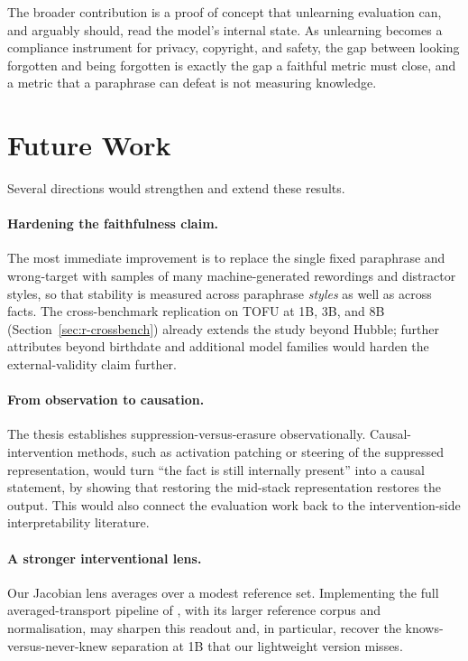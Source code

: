 The broader contribution is a proof of concept that unlearning evaluation can, and arguably should, read the
model's internal state. As unlearning becomes a compliance instrument for privacy, copyright, and safety,
the gap between looking forgotten and being forgotten is exactly the gap a faithful metric must close, and a
metric that a paraphrase can defeat is not measuring knowledge.

\section{Future Work}
\label{sec:c-future}

Several directions would strengthen and extend these results.

\paragraph{Hardening the faithfulness claim.}
The most immediate improvement is to replace the single fixed paraphrase and wrong-target with samples of
many machine-generated rewordings and distractor styles, so that stability is measured across paraphrase
\emph{styles} as well as across facts. The cross-benchmark replication on TOFU at 1B, 3B, and 8B
(Section~\ref{sec:r-crossbench}) already extends the study beyond Hubble; further attributes beyond
birthdate and additional model families would harden the external-validity claim further.

\paragraph{From observation to causation.}
The thesis establishes suppression-versus-erasure observationally. Causal-intervention methods, such as
activation patching or steering of the suppressed representation, would turn ``the fact is still internally
present'' into a causal statement, by showing that restoring the mid-stack representation restores the
output. This would also connect the evaluation work back to the intervention-side interpretability
literature.

\paragraph{A stronger interventional lens.}
Our Jacobian lens averages over a modest reference set. Implementing the full averaged-transport pipeline of
\citet{anthropic2026workspace}, with its larger reference corpus and normalisation, may sharpen this
readout and, in particular, recover the knows-versus-never-knew separation at 1B that our lightweight
version misses.

